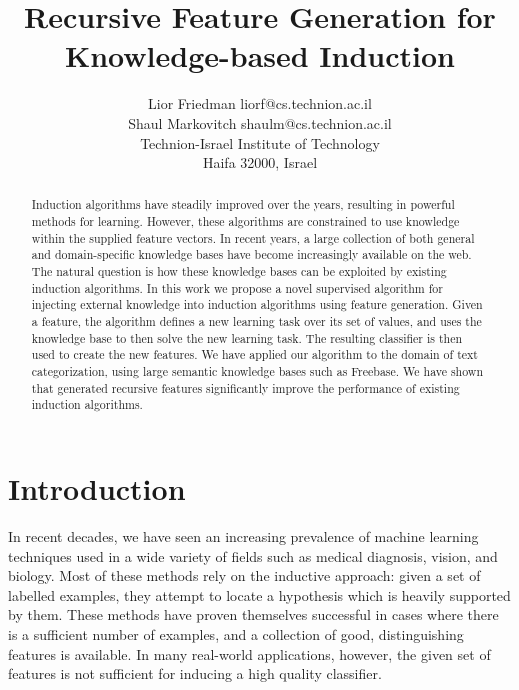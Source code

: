 \documentclass[twoside,11pt]{article}
\title{Recursive Feature Generation for Knowledge-based Induction}
\author{\name Lior Friedman \email liorf@cs.technion.ac.il \\
	\name Shaul Markovitch \email shaulm@cs.technion.ac.il \\
	\addr Technion-Israel Institute of Technology\\
	Haifa 32000, Israel
	}
\theoremstyle{definition}
\begin{document}
\maketitle

\begin{abstract}
  Induction algorithms have steadily improved over the years, resulting in powerful methods for learning. However, these algorithms are constrained to use knowledge within the supplied feature vectors. In recent years, a large collection of both general and domain-specific knowledge bases have become increasingly available on the web. The natural question is how these knowledge bases can be exploited by existing induction algorithms.
  In this work we propose a novel supervised algorithm for injecting external knowledge into induction algorithms using feature generation. Given a feature, the algorithm defines a new learning task over its set of values, and uses the knowledge base to then solve the new learning task. The resulting classifier is then used to create the new features.
  We have applied our algorithm to the domain of text categorization, using large semantic knowledge bases such as Freebase. We have shown that generated recursive features significantly improve the performance of existing induction algorithms.
\end{abstract}

\section{Introduction}
\label{sec:Intro}
In recent decades, we have seen an increasing prevalence of machine learning techniques used in a wide variety of fields such as medical diagnosis, vision, and biology.
Most of these methods rely on the inductive approach: given a set of labelled examples, they attempt to locate a hypothesis which is heavily supported by them. These methods have proven themselves successful in cases where there is a sufficient number of examples, and a collection of good,
distinguishing features is available.
In many real-world applications, however, the given set of features is not sufficient for inducing a high quality classifier.
\end{document}
